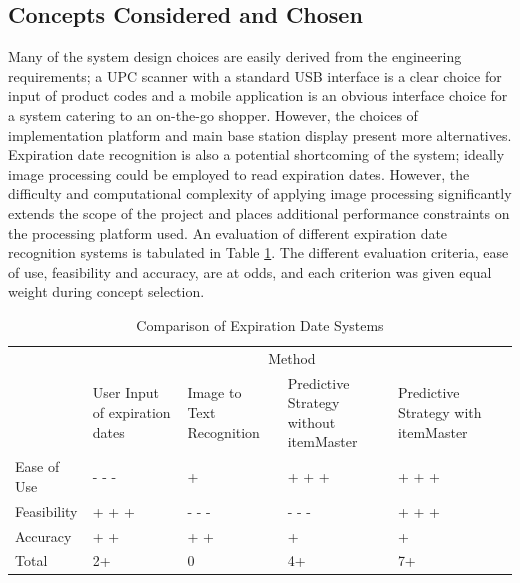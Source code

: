 \documentclass[11pt]{article} %
\begin{document}
\subsection{Concepts Considered and Chosen}
Many of the system design choices are easily derived from the engineering requirements; a UPC scanner with a standard USB interface is a clear choice for input of product codes and a mobile application is an obvious interface choice for a system catering to an on-the-go shopper. However, the choices of implementation platform and main base station display present more alternatives. Expiration date recognition is also a potential shortcoming of the system; ideally image processing could be employed to read expiration dates. However, the difficulty and computational complexity of applying image processing significantly extends the scope of the project and places additional performance constraints on the processing platform used. An evaluation of different expiration date recognition systems is tabulated in Table \ref{tab:datesys}. The different evaluation criteria, ease of use, feasibility and accuracy, are at odds, and each criterion was given equal weight during concept selection.
\begin{table}[h!]
\vspace{0.5cm}
\caption{Comparison of Expiration Date Systems}
\begin{tabular}{| p{1in} | p{1.15in} | p{1.15in} | p{1.15in} | p{1.15in}  | p{1.15in} |}
\cline{2-5}
\multicolumn{1}{c}{}&\multicolumn{4}{|c|}{Method} \\
\cline{2-5}
\multicolumn{1}{c|}{}&User Input \newline of expiration \newline dates& Image to Text \newline Recognition & Predictive \newline Strategy without \newline itemMaster& Predictive \newline Strategy with \newline itemMaster \\
\hline
Ease of Use&- - -&+&+ + +&+ + +\\
\hline
Feasibility&+ + +&- - -&- - -&+ + +\\
\hline
Accuracy & + + & + + &+&+\\
\hline \hline
Total &2+ &0&4+&7+\\
\hline
\end{tabular}
\label{tab:datesys}
\end{table}
\end{document}
